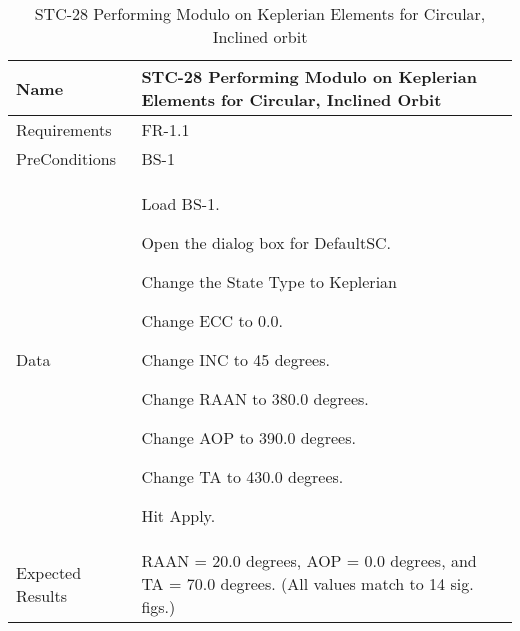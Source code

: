
\begin{table}[htbp!]
\centering
      \begin{tabular}{|p{1.05 in} |p{4.75 in} |}
      \hline
         \rowcolor[rgb]{0.8,0.8,0.8} Name & STC-28 Performing Modulo on Keplerian Elements for Circular, Inclined Orbit\\
         \hline
         Requirements & FR-1.1\\  \hline
         PreConditions & BS-1\\     \hline
         Data &
         \begin{compactenum}
             \item Load BS-1.
             \item Open the dialog box for DefaultSC.
             \item Change the State Type to Keplerian
             \item Change ECC to 0.0.
             \item Change INC to 45 degrees.
             \item Change RAAN to 380.0 degrees.
             \item Change AOP to 390.0 degrees.
             \item Change TA to 430.0 degrees.
             \item Hit Apply.
         \end{compactenum}
         \\ \hline
         Expected Results &  RAAN = 20.0 degrees, AOP = 0.0 degrees, and TA = 70.0 degrees. (All
         values match to 14 sig. figs.)\\
      \hline
      \end{tabular}
      \label{Table:STC-28}
      \caption{STC-28 Performing Modulo on Keplerian Elements for Circular, Inclined orbit}
\end{table} 